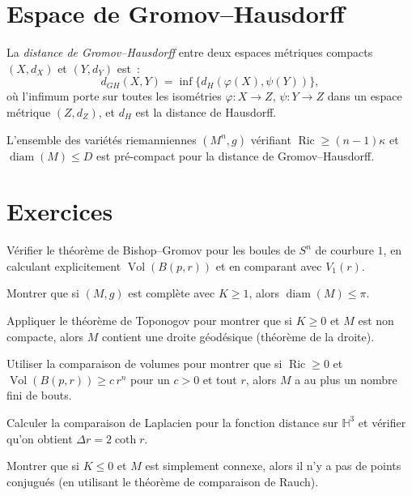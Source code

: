 \section{Espace de Gromov--Hausdorff}

\begin{definition}
La \emph{distance de Gromov--Hausdorff} entre deux espaces m\'etriques compacts
$(X, d_X)$ et $(Y, d_Y)$ est~:
\[
    d_{GH}(X, Y) = \inf \{ d_H(\varphi(X), \psi(Y)) \},
\]
o\`u l'infimum porte sur toutes les isom\'etries $\varphi : X \to Z$,
$\psi : Y \to Z$ dans un espace m\'etrique $(Z, d_Z)$, et $d_H$ est la distance
de Hausdorff.
\end{definition}

\begin{theoreme}
L'ensemble des vari\'et\'es riemanniennes $(M^n, g)$ v\'erifiant
$\operatorname{Ric} \geq (n-1)\kappa$ et $\operatorname{diam}(M) \leq D$
est pr\'e-compact pour la distance de Gromov--Hausdorff.
\end{theoreme}

\section{Exercices}

\begin{exercice}
V\'erifier le th\'eor\`eme de Bishop--Gromov pour les boules de $S^n$ de courbure $1$,
en calculant explicitement $\operatorname{Vol}(B(p, r))$ et en comparant avec
$V_1(r)$.
\end{exercice}

\begin{exercice}
Montrer que si $(M, g)$ est compl\`ete avec $K \geq 1$, alors
$\operatorname{diam}(M) \leq \pi$.
\end{exercice}

\begin{exercice}
Appliquer le th\'eor\`eme de Toponogov pour montrer que si $K \geq 0$ et $M$ est
non compacte, alors $M$ contient une droite g\'eod\'esique (th\'eor\`eme de la droite).
\end{exercice}

\begin{exercice}
Utiliser la comparaison de volumes pour montrer que si $\operatorname{Ric} \geq 0$
et $\operatorname{Vol}(B(p,r)) \geq c\, r^n$ pour un $c > 0$ et tout $r$, alors
$M$ a au plus un nombre fini de bouts.
\end{exercice}

\begin{exercice}
Calculer la comparaison de Laplacien pour la fonction distance sur $\mathbb{H}^3$
et v\'erifier qu'on obtient $\Delta r = 2\coth r$.
\end{exercice}

\begin{exercice}
Montrer que si $K \leq 0$ et $M$ est simplement connexe, alors il n'y a pas
de points conjugu\'es (en utilisant le th\'eor\`eme de comparaison de Rauch).
\end{exercice}
